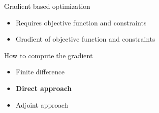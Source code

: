 \begin{frame}
\begin{columns}
\begin{column}{0.55\textwidth}
{}
    \end{column}
    \begin{column}{0.45\textwidth}
      \begin{block}{Gradient based optimization}
       \begin{itemize}
       \item Requires objective function and constraints
       \item Gradient of objective function and constraints
       \end{itemize}
       \end{block}
      \begin{block}{How to compute the gradient}
       \begin{itemize}
       \item Finite difference
       \item \textbf<2>{Direct approach}
       \item Adjoint approach
       \end{itemize}
       \end{block}
    \end{column}      
  \end{columns}

\end{frame}


